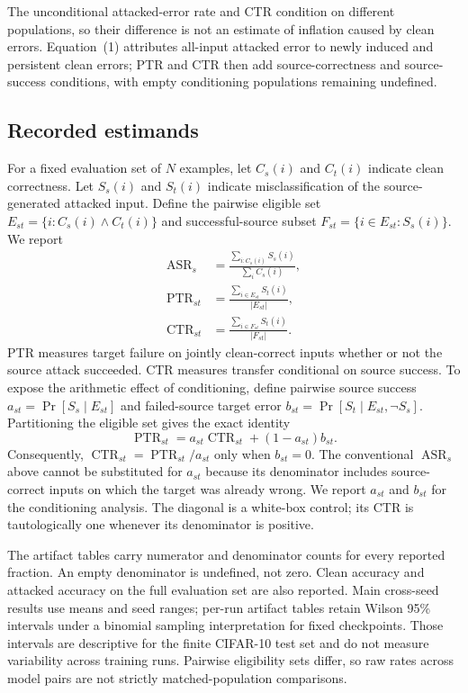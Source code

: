 \documentclass[10pt]{article}
\begin{document}
The unconditional attacked-error rate and CTR condition on different populations, so their difference is not an estimate of inflation caused by clean errors. Equation~(1) attributes all-input attacked error to newly induced and persistent clean errors; PTR and CTR then add source-correctness and source-success conditions, with empty conditioning populations remaining undefined.

\subsection{Recorded estimands}
For a fixed evaluation set of $N$ examples, let $C_s(i)$ and $C_t(i)$ indicate clean correctness. Let $S_s(i)$ and $S_t(i)$ indicate misclassification of the source-generated attacked input. Define the pairwise eligible set $E_{st}=\{i:C_s(i)\land C_t(i)\}$ and successful-source subset $F_{st}=\{i\in E_{st}:S_s(i)\}$. We report
\begin{align}
\operatorname{ASR}_s &= \frac{\sum_{i:C_s(i)} S_s(i)}{\sum_i C_s(i)},\\
\operatorname{PTR}_{st} &= \frac{\sum_{i\in E_{st}} S_t(i)}{|E_{st}|},\\
\operatorname{CTR}_{st} &= \frac{\sum_{i\in F_{st}} S_t(i)}{|F_{st}|}.
\end{align}
PTR measures target failure on jointly clean-correct inputs whether or not the source attack succeeded. CTR measures transfer conditional on source success. To expose the arithmetic effect of conditioning, define pairwise source success $a_{st}=\Pr[S_s\mid E_{st}]$ and failed-source target error $b_{st}=\Pr[S_t\mid E_{st},\neg S_s]$. Partitioning the eligible set gives the exact identity
\begin{equation}
\operatorname{PTR}_{st}=a_{st}\operatorname{CTR}_{st}+(1-a_{st})b_{st}.
\end{equation}
Consequently, $\operatorname{CTR}_{st}=\operatorname{PTR}_{st}/a_{st}$ only when $b_{st}=0$. The conventional $\operatorname{ASR}_s$ above cannot be substituted for $a_{st}$ because its denominator includes source-correct inputs on which the target was already wrong. We report $a_{st}$ and $b_{st}$ for the conditioning analysis. The diagonal is a white-box control; its CTR is tautologically one whenever its denominator is positive.

The artifact tables carry numerator and denominator counts for every reported fraction. An empty denominator is undefined, not zero. Clean accuracy and attacked accuracy on the full evaluation set are also reported. Main cross-seed results use means and seed ranges; per-run artifact tables retain Wilson 95\% intervals under a binomial sampling interpretation for fixed checkpoints. Those intervals are descriptive for the finite CIFAR-10 test set and do not measure variability across training runs. Pairwise eligibility sets differ, so raw rates across model pairs are not strictly matched-population comparisons.
\end{document}
